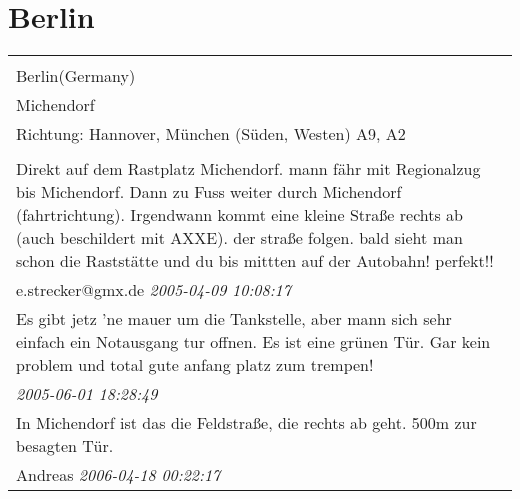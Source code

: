 \documentclass[a4paper,12pt]{article}
\begin{document}
\section{Berlin}
\begin{tabular}{|p{13cm}|}
\hline\\
Berlin(Germany)\\
Michendorf\\
Richtung: Hannover, München (Süden, Westen) A9, A2 \\
\hline\\
Direkt auf dem Rastplatz Michendorf. mann fähr mit Regionalzug bis Michendorf. Dann zu Fuss weiter durch Michendorf (fahrtrichtung). Irgendwann kommt eine kleine Straße rechts ab (auch beschildert mit AXXE). der straße folgen. bald sieht man schon die Raststätte und du bis mittten auf der Autobahn! perfekt!! \\
e.strecker@gmx.de \textit{ 2005-04-09 10:08:17 }\\\hline Es gibt jetz 'ne mauer um die Tankstelle, aber mann sich sehr einfach ein Notausgang tur offnen. Es ist eine grünen Tür.
Gar kein problem und total gute anfang platz zum trempen! \\
\textit{ 2005-06-01 18:28:49 }\\\hline In Michendorf ist das die Feldstraße, die rechts ab geht. 500m zur besagten Tür. \\
Andreas \textit{ 2006-04-18 00:22:17 }\\\hline
\end{tabular}
\end{document}
